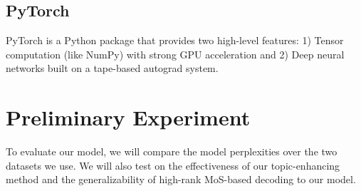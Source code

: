 \documentclass[11pt,a4paper]{article}
\begin{document}
\subsection{PyTorch}
\label{subsec:pytorch}
PyTorch is a Python package that provides two high-level features: 1) Tensor computation (like NumPy) with strong GPU acceleration and 2) Deep neural networks built on a tape-based autograd system.

\section{Preliminary Experiment}
\label{experiment}
To evaluate our model, we will compare the model perplexities over the two datasets we use. We will also test on the effectiveness of our topic-enhancing method and the generalizability of high-rank MoS-based decoding to our model.




\appendix
\end{document}

